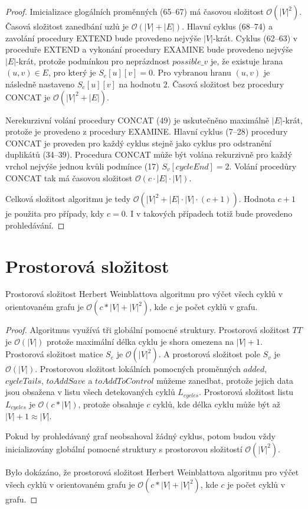         \begin{proof}
            Imicializace glogálních proměnných (65--67) má časovou složitost $\mathcal{O}(|V|^2)$. Časová složitost zanedbání uzlů je $\mathcal{O}(|V| + |E|)$. Hlavní cyklus (68--74) a zavolání procedury EXTEND bude provedeno nejvýše $|V|$-krát. Cyklus (62--63) v proceduře EXTEND a vykonání procedury EXAMINE bude provedeno nejvýše $|E|$-krát, protože podmínkou pro neprázdnost $possible\_v$ je, že existuje hrana $(u, v) \in E$, pro který je $S_e[u][v] = 0$. Pro vybranou hranu $(u, v)$ je následně nastaveno $S_e[u][v]$ na hodnotu $2$. Časová složitost bez procedury CONCAT je $\mathcal{O}(|V|^2 + |E|)$.

            Nerekurzivní volání procedury CONCAT (49) je uskutečněno maximálně $|E|$-krát, protože je provedeno z procedury EXAMINE. Hlavní cyklus (7--28) procedury CONCAT je proveden pro každý cyklus stejně jako cyklus pro odstranění duplikátů (34--39). Procedura CONCAT může být volána rekurzivně pro každý vrchol nejvýše jednou kvůli podmínce (17) $S_v[cycleEnd] = 2$. Volání procedůry CONCAT tak má časovou složitost $\mathcal{O}(c \cdot |E| \cdot |V|)$.

            Celková složitost algoritmu je tedy $\mathcal{O}(|V|^2 + |E|\cdot|V|\cdot(c + 1))$. Hodnota $c + 1$ je použita pro případy, kdy $c = 0$. I v takových případech totiž bude provedeno prohledávání.
        \end{proof}

    \section{Prostorová složitost}
        \begin{theorem}
            Prostorová složitost Herbert Weinblattova algoritmu pro výčet všech cyklů v orientovaném grafu je $\mathcal{O}(c * |V| + |V|^2)$, kde $c$ je počet cyklů v grafu.
        \end{theorem}

        \begin{proof}
            Algoritmus využívá tři globální pomocné struktury. Prostorová složitost $TT$ je $\mathcal{O}(|V|)$ protože maximální délka cyklu je shora omezena na $|V| + 1$. Prostorová složitost matice $S_e$ je $\mathcal{O}(|V|^2)$. A prostorová složitost pole $S_v$ je $\mathcal{O}(|V|)$. Prostorovou složitost lokálních pomocných proměnných $added$, $cycleTails$, $toAddSave$ a $toAddToControl$ můžeme zanedbat, protože jejich data jsou obsažena v listu všech detekovaných cyklů $L_{cycles}$. Prostorová složitost listu $L_{cycles}$ je $\mathcal{O}(c * |V|)$, protože obsahuje $c$ cyklů, kde délka cyklu může být až $|V| + 1 \approx |V|$.

            Pokud by prohledávaný graf neobsahoval žádný cyklus, potom budou vždy inicializovány globální pomocné struktury s prostorovou složitostí $\mathcal{O}(|V|^2)$.

            Bylo dokázáno, že prostorová složitost Herbert Weinblattova algoritmu pro výčet všech cyklů v orientovaném grafu je $\mathcal{O}(c * |V| + |V|^2)$, kde $c$ je počet cyklů v grafu.
        \end{proof}

